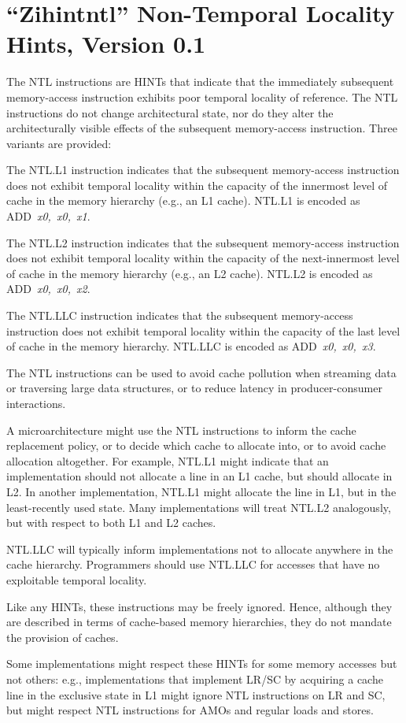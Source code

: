 \chapter{``Zihintntl'' Non-Temporal Locality Hints, Version 0.1}
\label{chap:zihintpause}

The NTL instructions are HINTs that indicate that the immediately subsequent
memory-access instruction exhibits poor temporal locality of reference.
The NTL instructions do not change architectural state, nor do they alter the
architecturally visible effects of the subsequent memory-access instruction.
Three variants are provided:

The NTL.L1 instruction indicates that the subsequent memory-access instruction
does not exhibit temporal locality within the capacity of the innermost level
of cache in the memory hierarchy (e.g., an L1 cache).
NTL.L1 is encoded as \mbox{ADD {\em x0, x0, x1}}.

The NTL.L2 instruction indicates that the subsequent memory-access instruction
does not exhibit temporal locality within the capacity of the next-innermost
level of cache in the memory hierarchy (e.g., an L2 cache).
NTL.L2 is encoded as \mbox{ADD {\em x0, x0, x2}}.

The NTL.LLC instruction indicates that the subsequent memory-access
instruction does not exhibit temporal locality within the capacity of the last
level of cache in the memory hierarchy.
NTL.LLC is encoded as \mbox{ADD {\em x0, x0, x3}}.

\begin{commentary}
The NTL instructions can be used to avoid cache pollution when streaming data
or traversing large data structures, or to reduce latency in producer-consumer
interactions.

A microarchitecture might use the NTL instructions to inform the cache
replacement policy, or to decide which cache to allocate into, or to avoid
cache allocation altogether.
For example, NTL.L1 might indicate that an implementation should not allocate
a line in an L1 cache, but should allocate in L2.
In another implementation, NTL.L1 might allocate the line in L1, but in
the least-recently used state.
Many implementations will treat NTL.L2 analogously, but with respect to both
L1 and L2 caches.

NTL.LLC will typically inform implementations not to allocate anywhere in the
cache hierarchy.
Programmers should use NTL.LLC for accesses that have no exploitable temporal
locality.

Like any HINTs, these instructions may be freely ignored.
Hence, although they are described in terms of cache-based memory hierarchies,
they do not mandate the provision of caches.

Some implementations might respect these HINTs for some memory accesses but
not others: e.g., implementations that implement LR/SC by acquiring a
cache line in the exclusive state in L1 might ignore NTL instructions
on LR and SC, but might respect NTL instructions for
AMOs and regular loads and stores.
\end{commentary}

